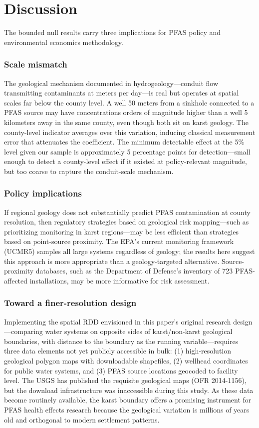 \documentclass[12pt]{article}
\begin{document}


\section{Discussion}

The bounded null results carry three implications for PFAS policy and environmental economics methodology.

\subsubsection*{Scale mismatch} The geological mechanism documented in hydrogeology---conduit flow transmitting contaminants at meters per day---is real but operates at spatial scales far below the county level. A well 50 meters from a sinkhole connected to a PFAS source may have concentrations orders of magnitude higher than a well 5 kilometers away in the same county, even though both sit on karst geology. The county-level indicator averages over this variation, inducing classical measurement error that attenuates the coefficient. The minimum detectable effect at the 5\% level given our sample is approximately 5 percentage points for detection---small enough to detect a county-level effect if it existed at policy-relevant magnitude, but too coarse to capture the conduit-scale mechanism.

\subsubsection*{Policy implications} If regional geology does not substantially predict PFAS contamination at county resolution, then regulatory strategies based on geological risk mapping---such as prioritizing monitoring in karst regions---may be less efficient than strategies based on point-source proximity. The EPA's current monitoring framework (UCMR5) samples all large systems regardless of geology; the results here suggest this approach is more appropriate than a geology-targeted alternative. Source-proximity databases, such as the Department of Defense's inventory of 723 PFAS-affected installations, may be more informative for risk assessment.

\subsubsection*{Toward a finer-resolution design} Implementing the spatial RDD envisioned in this paper's original research design---comparing water systems on opposite sides of karst/non-karst geological boundaries, with distance to the boundary as the running variable---requires three data elements not yet publicly accessible in bulk: (1) high-resolution geological polygon maps with downloadable shapefiles, (2) wellhead coordinates for public water systems, and (3) PFAS source locations geocoded to facility level. The USGS has published the requisite geological maps (OFR 2014-1156), but the download infrastructure was inaccessible during this study. As these data become routinely available, the karst boundary offers a promising instrument for PFAS health effects research because the geological variation is millions of years old and orthogonal to modern settlement patterns.
\end{document}
